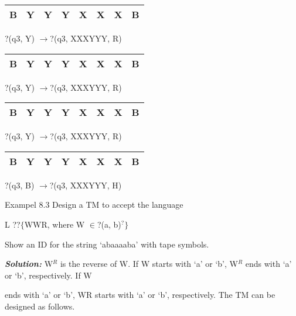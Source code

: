 \noindent 

\noindent 

\noindent 

\noindent 

\noindent 

\begin{tabular}{|p{0.2in}|p{0.2in}|p{0.2in}|p{0.2in}|p{0.2in}|p{0.2in}|p{0.2in}|p{0.2in}|} \hline 
B & Y & Y & Y & X & X & X & B \\ \hline 
\end{tabular}

?(q3, Y) $\mathrm{\to }$?(q3, XXXYYY, R)

\noindent 

\begin{tabular}{|p{0.2in}|p{0.2in}|p{0.2in}|p{0.2in}|p{0.2in}|p{0.2in}|p{0.2in}|p{0.2in}|} \hline 
B & Y & Y & Y & X & X & X & B \\ \hline 
\end{tabular}

?(q3, Y) $\mathrm{\to }$?(q3, XXXYYY, R)

\noindent 

\begin{tabular}{|p{0.2in}|p{0.2in}|p{0.2in}|p{0.2in}|p{0.2in}|p{0.2in}|p{0.2in}|p{0.2in}|} \hline 
B & Y & Y & Y & X & X & X & B \\ \hline 
\end{tabular}

?(q3, Y) $\mathrm{\to }$?(q3, XXXYYY, R)

\noindent 

\begin{tabular}{|p{0.2in}|p{0.2in}|p{0.2in}|p{0.2in}|p{0.2in}|p{0.2in}|p{0.2in}|p{0.2in}|} \hline 
B & Y & Y & Y & X & X & X & B \\ \hline 
\end{tabular}

?(q3, B) $\mathrm{\to }$?(q3, XXXYYY, H)

\noindent 

\noindent     Exampel 8.3      Design a TM to accept the language

\noindent L ??$\mathrm{\{}$WWR, where W $\in $?(a, b)${}^{\mathrm{\textrm{?}}}$$\mathrm{\}}$

\noindent Show an ID for the string `abaaaaba' with tape symbols.

\noindent \textbf{\textit{Solution: }}W${}^{R}$ is the reverse of W. If W starts with `a' or `b', W${}^{R}$ ends with `a' or `b', respectively. If W

\noindent ends with `a' or `b', WR starts with `a' or `b', respectively. The TM can be designed as follows.

